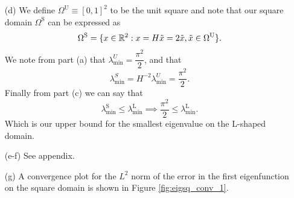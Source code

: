 \documentclass{article}
\begin{document}
\begin{itemize}
	\item[(d)] We define \(\Omega^\text{U} \equiv [0,1]^2 \) to be the unit square and note that our square domain \(\Omega^\text{S} \)  can be expressed as
	\begin{equation*}
		\Omega^\text{S} = \{x\in\mathbb{R}^2 : x = H\tilde{x} = 2\tilde{x}, \tilde{x} \in \Omega^\text{U} \}.
	\end{equation*}
	We note from part (a) that \(\lambda_\text{min}^U = \dfrac{\pi^2}{2} \), and that
	\begin{equation*}
		\lambda_\text{min}^S = H^{-2} \lambda_\text{min}^U = \dfrac{\pi^2}{2}.
	\end{equation*}
	Finally from part (c) we can say that
	\begin{equation*}
		\lambda_\text{min}^\text{S} \leq \lambda_\text{min}^\text{L} \implies \dfrac{\pi^2}{2} \leq \lambda_\text{min}^\text{L}.
	\end{equation*}
	Which is our upper bound for the smallest eigenvalue on the L-shaped domain.
	
	\item[(e-f)] See appendix.
	
	\item[(g)] A convergence plot for the \(L^2\) norm of the error in the first eigenfunction on the square domain is shown in Figure \ref{fig:eigsq_conv_1}.
	

\end{itemize}
\end{document}

